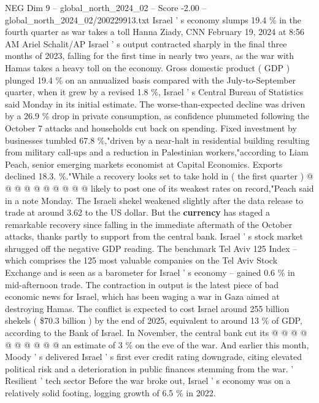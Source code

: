 \begin{textsample}{NEG Dim 9 – global\_north\_2024\_02 – Score -2.00 – global\_north\_2024\_02/200229913.txt}  \label{ex:f9_neg_244}
Israel ' s economy slumps 19.4 \% in the fourth quarter as war takes a toll Hanna Ziady, CNN February 19, 2024 at 8:56 AM Ariel Schalit/AP Israel ' s output contracted sharply in the final three months of 2023, falling for the first time in nearly two years, as the war with Hamas takes a heavy toll on the economy.
Gross domestic product ( GDP ) plunged 19.4 \% on an annualized basis compared with the July-to-September quarter, when it grew by a revised 1.8 \%, Israel ' s Central Bureau of Statistics said Monday in its initial estimate.
The worse-than-expected decline was driven by a 26.9 \% drop in private consumption, as confidence plummeted following the October 7 attacks and households cut back on spending.
Fixed investment by businesses tumbled 67.8 \%,"driven by a near-halt in residential building resulting from military call-ups and a reduction in Palestinian workers,"according to Liam Peach, senior emerging markets economist at Capital Economics.
Exports declined 18.3. \%."While a recovery looks set to take hold in ( the first quarter ) @ @ @ @ @ @ @ @ @ @ likely to post one of its weakest rates on record,"Peach said in a note Monday.
The Israeli shekel weakened slightly after the data release to trade at around 3.62 to the US dollar.
But the \textbf{currency} has staged a remarkable recovery since falling in the immediate aftermath of the October attacks, thanks partly to support from the central bank.
Israel ' s stock market shrugged off the negative GDP reading.
The benchmark Tel Aviv 125 Index -- which comprises the 125 most valuable companies on the Tel Aviv Stock Exchange and is seen as a barometer for Israel ' s economy -- gained 0.6 \% in mid-afternoon trade.
The contraction in output is the latest piece of bad economic news for Israel, which has been waging a war in Gaza aimed at destroying Hamas.
The conflict is expected to cost Israel around 255 billion shekels ( \$70.3 billion ) by the end of 2025, equivalent to around 13 \% of GDP, according to the Bank of Israel.
In November, the central bank cut its @ @ @ @ @ @ @ @ @ @ an estimate of 3 \% on the eve of the war.
And earlier this month, Moody ' s delivered Israel ' s first ever credit rating downgrade, citing elevated political risk and a deterioration in public finances stemming from the war. ' Resilient ' tech sector Before the war broke out, Israel ' s economy was on a relatively solid footing, logging growth of 6.5 \% in 2022.

\end{textsample}
